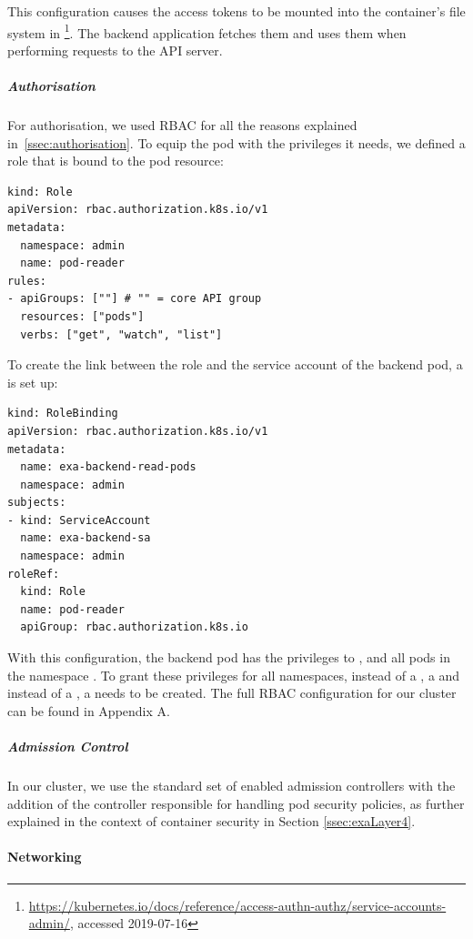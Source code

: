 This configuration causes the access tokens to be mounted into the container's file system in \footnote{\url{https://kubernetes.io/docs/reference/access-authn-authz/service-accounts-admin/}, accessed 2019-07-16}. The backend application fetches them and uses them when performing requests to the API server.

\subparagraph{Authorisation}
For authorisation, we used \ac{RBAC} for all the reasons explained in~\ref{ssec:authorisation}. To equip the pod with the privileges it needs, we defined a role that is bound to the pod resource:

\begin{verbatim}
kind: Role
apiVersion: rbac.authorization.k8s.io/v1
metadata:
  namespace: admin
  name: pod-reader
rules:
- apiGroups: [""] # "" = core API group
  resources: ["pods"]
  verbs: ["get", "watch", "list"]
\end{verbatim}

To create the link between the role and the service account of the backend pod, a  is set up: 

\begin{verbatim}
kind: RoleBinding
apiVersion: rbac.authorization.k8s.io/v1
metadata:
  name: exa-backend-read-pods
  namespace: admin
subjects:
- kind: ServiceAccount
  name: exa-backend-sa 
  namespace: admin
roleRef:
  kind: Role
  name: pod-reader
  apiGroup: rbac.authorization.k8s.io
\end{verbatim}

With this configuration, the backend pod has the privileges to ,  and  all pods in the namespace . To grant these privileges for all namespaces, instead of a , a  and instead of a , a  needs to be created. The full \ac{RBAC} configuration for our cluster can be found in Appendix A.

\subparagraph{Admission Control}

In our cluster, we use the standard set of enabled admission controllers with the addition of the controller responsible for handling pod security policies, as further explained in the context of container security in Section \ref{ssec:exaLayer4}.


\paragraph{Networking}


